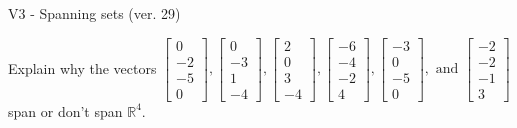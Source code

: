 \begin{exercise}
  \begin{exerciseTitle}V3 - Spanning sets (ver. 29)\end{exerciseTitle}
  \begin{exerciseStatement}
    Explain why the vectors \(\left[\begin{array}{r}
0 \\
-2 \\
-5 \\
0
\end{array}\right] , \left[\begin{array}{r}
0 \\
-3 \\
1 \\
-4
\end{array}\right] , \left[\begin{array}{r}
2 \\
0 \\
3 \\
-4
\end{array}\right] , \left[\begin{array}{r}
-6 \\
-4 \\
-2 \\
4
\end{array}\right] , \left[\begin{array}{r}
-3 \\
0 \\
-5 \\
0
\end{array}\right] , \text{ and } \left[\begin{array}{r}
-2 \\
-2 \\
-1 \\
3
\end{array}\right]\) span or don't span \(\mathbb{R}^4\). 
	



\end{exerciseStatement}
\end{exercise}

